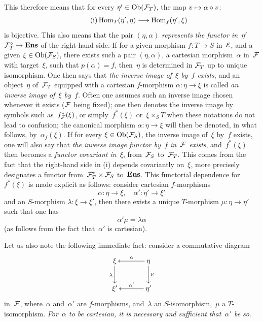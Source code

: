 This therefore means that for every $\eta'\in\Ob(\cal{F}_T)$,
the map $v \mto \alpha\circ v$:
\begin{equation}
\tag{i} \Hom_T(\eta',\eta) \to \Hom_f(\eta',\xi)
\end{equation}
is bijective. This also means that the pair $(\eta,\alpha)$
\emph{represents the functor in~$\eta'$} $\cal{F}^{\circ}_T \to
\Ens$ of the right-hand side. If for a given morphism $f\colon T \to S$
in~$\cal{E}$, and a given $\xi \in \Ob(\cal{F}_S)$, there
exists such a pair $(\eta,\alpha)$, \ie a
cartesian morphism~$\alpha$ in~$\cal{F}$ with target~$\xi$, such that
$p(\alpha)=f$, then~$\eta$ is determined in $\cal{F}_T$
up to unique isomorphism. One then says that \emph{the inverse
image of~$\xi$ by~$f$ exists}, and an object~$\eta$ of~$\cal{F}_T$
equipped with a cartesian $f$-morphism $\alpha\colon \eta \to \xi$ is
called \emph{an inverse image of~$\xi$ by~$f$}.
Often one assumes
such an inverse image chosen whenever it exists ($\cal{F}$
being fixed); one then denotes the inverse image by symbols
such as~$f^*_{\cal{F}}(\xi)$, or simply~$f^*(\xi)$
or~$\xi \times_S T$
when these notations do not lead to
confusion;
the canonical morphism $\alpha\colon \eta \to \xi$ will then be
denoted, in what follows, by~$\alpha_f(\xi)$.
If for every $\xi \in \Ob(\cal{F}_S)$, the inverse image of~$\xi$
by~$f$ exists, one will also say that \emph{the inverse image functor
by~$f$ in~$\cal{F}$ exists}, and~$f^*(\xi)$ then becomes a
\emph{functor covariant in~$\xi$}, from~$\cal{F}_S$ to~$\cal{F}_T$.
This comes from the fact that the right-hand side in (i) depends
covariantly on~$\xi$, \ie more precisely
designates a functor from~$\cal{F}^{\circ}_T \times \cal{F}_S$
to~$\Ens$. This functorial dependence for~$f^*(\xi)$
is made explicit as follows: consider cartesian $f$-morphisms
$$
\alpha\colon \eta \to \xi, \quad \alpha'\colon \eta' \to \xi'
$$
and an $S$-morphism $\lambda\colon \xi \to \xi'$, then there exists a
unique $T$-morphism $\mu\colon \eta\to\eta'$ such that one has
$$
\alpha' \mu = \lambda \alpha
$$
(as follows from the fact that~$\alpha'$ is cartesian).

Let us also note the following immediate fact: consider a
commutative diagram
$$
\xymatrix@C=1.2cm{
\xi\ar[d]_-{\lambda}& \ar[l]_-{\alpha}\eta \ar[d]^-{\mu}\\
\xi' &\ar[l]_-{\alpha'}\eta'
}
$$
in~$\cal{F}$,
where~$\alpha$ and~$\alpha'$ are $f$-morphisms, and~$\lambda$ an
$S$-isomorphism,~$\mu$ a $T$-isomorphism. \emph{For~$\alpha$
to be cartesian, it is necessary and sufficient that~$\alpha'$
be so}.

